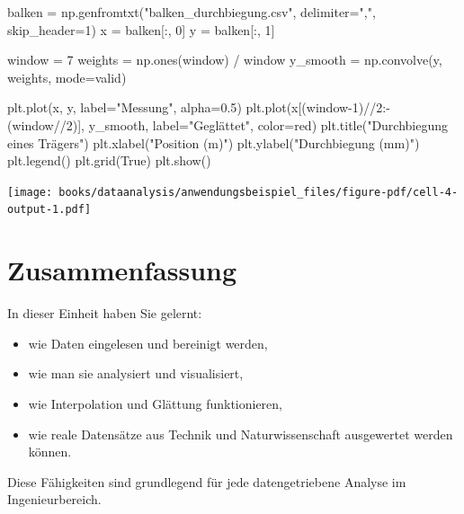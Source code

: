 \documentclass[
  letterpaper,
  DIV=11,
  numbers=noendperiod]{scrreprt}
\newenvironment{Shaded}{\begin{snugshade}}{\end{snugshade}}
\newcommand{\DecValTok}[1]{\textcolor[rgb]{0.68,0.00,0.00}{#1}}
\newcommand{\FloatTok}[1]{\textcolor[rgb]{0.68,0.00,0.00}{#1}}
\newcommand{\NormalTok}[1]{\textcolor[rgb]{0.00,0.23,0.31}{#1}}
\newcommand{\OperatorTok}[1]{\textcolor[rgb]{0.37,0.37,0.37}{#1}}
\newcommand{\StringTok}[1]{\textcolor[rgb]{0.13,0.47,0.30}{#1}}
\newcommand{\VariableTok}[1]{\textcolor[rgb]{0.07,0.07,0.07}{#1}}
\providecommand{\tightlist}{%
  \setlength{\itemsep}{0pt}\setlength{\parskip}{0pt}}\usepackage{longtable,booktabs,array}
\begin{document}
\begin{Shaded}
\begin{Highlighting}[]
\NormalTok{balken }\OperatorTok{=}\NormalTok{ np.genfromtxt(}\StringTok{"balken\_durchbiegung.csv"}\NormalTok{, delimiter}\OperatorTok{=}\StringTok{","}\NormalTok{, skip\_header}\OperatorTok{=}\DecValTok{1}\NormalTok{)}
\NormalTok{x }\OperatorTok{=}\NormalTok{ balken[:, }\DecValTok{0}\NormalTok{]}
\NormalTok{y }\OperatorTok{=}\NormalTok{ balken[:, }\DecValTok{1}\NormalTok{]}

\NormalTok{window }\OperatorTok{=} \DecValTok{7}
\NormalTok{weights }\OperatorTok{=}\NormalTok{ np.ones(window) }\OperatorTok{/}\NormalTok{ window}
\NormalTok{y\_smooth }\OperatorTok{=}\NormalTok{ np.convolve(y, weights, mode}\OperatorTok{=}\StringTok{\textquotesingle{}valid\textquotesingle{}}\NormalTok{)}

\NormalTok{plt.plot(x, y, label}\OperatorTok{=}\StringTok{"Messung"}\NormalTok{, alpha}\OperatorTok{=}\FloatTok{0.5}\NormalTok{)}
\NormalTok{plt.plot(x[(window}\OperatorTok{{-}}\DecValTok{1}\NormalTok{)}\OperatorTok{//}\DecValTok{2}\NormalTok{:}\OperatorTok{{-}}\NormalTok{(window}\OperatorTok{//}\DecValTok{2}\NormalTok{)], y\_smooth, label}\OperatorTok{=}\StringTok{"Geglättet"}\NormalTok{, color}\OperatorTok{=}\StringTok{\textquotesingle{}red\textquotesingle{}}\NormalTok{)}
\NormalTok{plt.title(}\StringTok{"Durchbiegung eines Trägers"}\NormalTok{)}
\NormalTok{plt.xlabel(}\StringTok{"Position (m)"}\NormalTok{)}
\NormalTok{plt.ylabel(}\StringTok{"Durchbiegung (mm)"}\NormalTok{)}
\NormalTok{plt.legend()}
\NormalTok{plt.grid(}\VariableTok{True}\NormalTok{)}
\NormalTok{plt.show()}
\end{Highlighting}
\end{Shaded}

\texttt{[image: books/dataanalysis/anwendungsbeispiel\_files/figure-pdf/cell-4-output-1.pdf]}

\section{Zusammenfassung}\label{zusammenfassung}

In dieser Einheit haben Sie gelernt:

\begin{itemize}
\tightlist
\item
  wie Daten eingelesen und bereinigt werden,
\item
  wie man sie analysiert und visualisiert,
\item
  wie Interpolation und Glättung funktionieren,
\item
  wie reale Datensätze aus Technik und Naturwissenschaft ausgewertet
  werden können.
\end{itemize}

Diese Fähigkeiten sind grundlegend für jede datengetriebene Analyse im
Ingenieurbereich.
\end{document}
